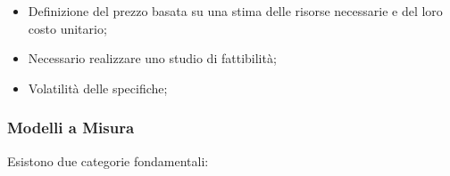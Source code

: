 \documentclass{article}
\begin{document}
\begin{critical}[Criticità]
    \begin{itemize}
        \item Definizione del prezzo basata su una stima delle risorse necessarie e del loro costo unitario;
        \item Necessario realizzare uno studio di fattibilità;
        \item Volatilità delle specifiche;
    \end{itemize}
\end{critical}
%
\subsubsection{Modelli a Misura}\label{sub:modelli_a_misura} %
Esistono due categorie fondamentali:
\end{document}
